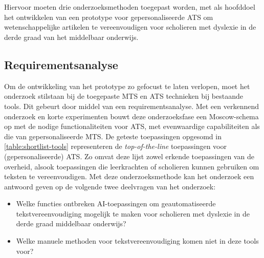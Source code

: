 
\chapter{}%
\label{ch:methodologie}


Hiervoor moeten drie onderzoeksmethoden toegepast worden, met als hoofddoel het ontwikkelen van een prototype voor gepersonaliseerde ATS om wetenschappelijke artikelen te vereenvoudigen voor scholieren met dyslexie in de derde graad van het middelbaar onderwijs.

\section{Requirementsanalyse}
\label{sec:requirementsanalyse}

Om de ontwikkeling van het prototype zo gefocust te laten verlopen, moet het onderzoek stilstaan bij de toegepaste MTS en ATS technieken bij bestaande tools. Dit gebeurt door middel van een requirementsanalyse. Met een verkennend onderzoek en korte experimenten bouwt deze onderzoeksfase een Moscow-schema op met de nodige functionaliteiten voor ATS, met evenwaardige capabiliteiten als die van gepersonaliseerde MTS. De geteste toepassingen opgesomd in \ref{table:shortlist-tools} representeren de \textit{top-of-the-line} toepassingen voor (gepersonaliseerde) ATS. Zo omvat deze lijst zowel erkende toepassingen van de overheid, alsook toepassingen die leerkrachten of scholieren kunnen gebruiken om teksten te vereenvoudigen. Met deze onderzoeksmethode kan het onderzoek een antwoord geven op de volgende twee deelvragen van het onderzoek:

\begin{itemize}
	\item Welke functies ontbreken AI-toepassingen om geautomatiseerde tekstvereenvoudiging mogelijk te maken voor scholieren met dyslexie in de derde graad middelbaar onderwijs?
	\item Welke manuele methoden voor tekstvereenvoudiging komen niet in deze tools voor?
\end{itemize}

